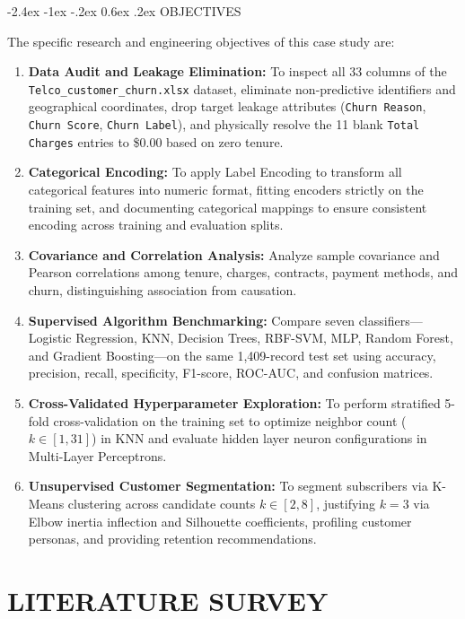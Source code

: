 \documentclass[12pt,oneside]{report}
\makeatletter
\renewcommand{\section}{\@startsection{section}{1}{\z@}%
  {-2.4ex \@plus -1ex \@minus -.2ex}%
  {0.6ex \@plus .2ex}%
  {\normalfont\large\bfseries}}
\newcommand{\chapterpage}[1]{\chapter{#1}}
\makeatother
\begin{document}
\section{OBJECTIVES}

The specific research and engineering objectives of this case study are:
\begin{enumerate}
    \item \textbf{Data Audit and Leakage Elimination:} To inspect all 33 columns of the \texttt{Telco\_customer\_churn.xlsx} dataset, eliminate non-predictive identifiers and geographical coordinates, drop target leakage attributes (\texttt{Churn Reason}, \texttt{Churn Score}, \texttt{Churn Label}), and physically resolve the 11 blank \texttt{Total Charges} entries to \$0.00 based on zero tenure.
    \item \textbf{Categorical Encoding:} To apply Label Encoding to transform all categorical features into numeric format, fitting encoders strictly on the training set, and documenting categorical mappings to ensure consistent encoding across training and evaluation splits.
    \item \textbf{Covariance and Correlation Analysis:} Analyze sample covariance and Pearson correlations among tenure, charges, contracts, payment methods, and churn, distinguishing association from causation.
    \item \textbf{Supervised Algorithm Benchmarking:} Compare seven classifiers---Logistic Regression, KNN, Decision Trees, RBF-SVM, MLP, Random Forest, and Gradient Boosting---on the same 1,409-record test set using accuracy, precision, recall, specificity, F1-score, ROC-AUC, and confusion matrices.
    \item \textbf{Cross-Validated Hyperparameter Exploration:} To perform stratified 5-fold cross-validation on the training set to optimize neighbor count ($k \in [1, 31]$) in KNN and evaluate hidden layer neuron configurations in Multi-Layer Perceptrons.
    \item \textbf{Unsupervised Customer Segmentation:} To segment subscribers via K-Means clustering across candidate counts $k \in [2, 8]$, justifying $k=3$ via Elbow inertia inflection and Silhouette coefficients, profiling customer personas, and providing retention recommendations.
\end{enumerate}

\clearpage

\chapterpage{LITERATURE SURVEY}
\end{document}
